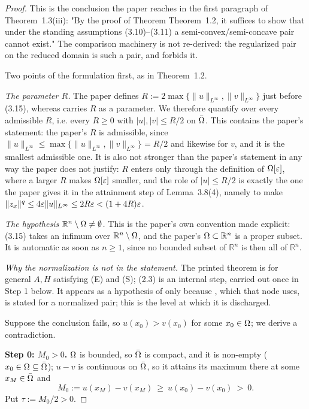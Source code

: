 \begin{proof}
This is the conclusion the paper reaches in the first paragraph of Theorem~1.3(iii): "By the
proof of Theorem Theorem~1.2, it suffices to show that under the standing assumptions
(3.10)--(3.11) a semi-convex/semi-concave pair cannot exist." The comparison machinery is
not re-derived: the regularized pair on the reduced domain is such a pair, and
 forbids it.

Two points of the formulation first, as in Theorem~1.2.

\emph{The parameter $R$.} The paper defines $R:=2\max\{\|u\|_{L^\infty},\|v\|_{L^\infty}\}$
just before (3.15), whereas  carries $R$ as a parameter. We
therefore quantify over every admissible $R$, i.e. every $R\ge0$ with $|u|,|v|\le R/2$ on
$\bar{\Omega}$. This contains the paper's statement: the paper's $R$ is admissible, since
$\|u\|_{L^\infty}\le\max\{\|u\|_{L^\infty},\|v\|_{L^\infty}\}=R/2$ and likewise for $v$, and
it is the smallest admissible one. It is also not stronger than the paper's statement in any
way the paper does not justify: $R$ enters only through the definition of $\Omega[\varepsilon]$, where
a larger $R$ makes $\Omega[\varepsilon]$ smaller, and the role of $|u|\le R/2$ is exactly the one the
paper gives it in the attainment step of Lemma~3.8(4), namely to make
$\|z_x\|^{q}\le4\varepsilon\|u\|_{L^\infty}\le2R\varepsilon<(1+4R)\varepsilon$.

\emph{The hypothesis $\mathbb R^{n}\setminus\Omega\ne\emptyset$.} This is the paper's own
convention made explicit: (3.15) takes an infimum over $\mathbb R^{n}\setminus\Omega$, and the
paper's $\Omega\subset\mathbb R^{n}$ is a proper subset. It is automatic as soon as $n\ge1$,
since no bounded subset of $\mathbb R^{n}$ is then all of $\mathbb R^{n}$.

\emph{Why the normalization is not in the statement.} The printed theorem is for general
$A,H$ satisfying (E) and (S); (2.3) is an internal step, carried out once in Step 1
below. It appears as a hypothesis of  only because
, which that node uses, is stated for a
normalized pair; this is the level at which it is discharged.

\medskip
Suppose the conclusion fails, so $u(x_0)>v(x_0)$ for some $x_0\in\Omega$; we derive a
contradiction.

\medskip\noindent\textbf{Step 0: $M_0>0$.} $\Omega$ is bounded, so $\bar{\Omega}$ is compact, and it
is non-empty ($x_0\in\Omega\subseteq\bar{\Omega}$); $u-v$ is continuous on $\bar{\Omega}$, so it attains
its maximum there at some $x_M\in\bar{\Omega}$ and
\[
 M_0:=u(x_M)-v(x_M)\ \ge\ u(x_0)-v(x_0)\ >\ 0 .
\]
Put $\tau:=M_0/2>0$.


\end{proof}
